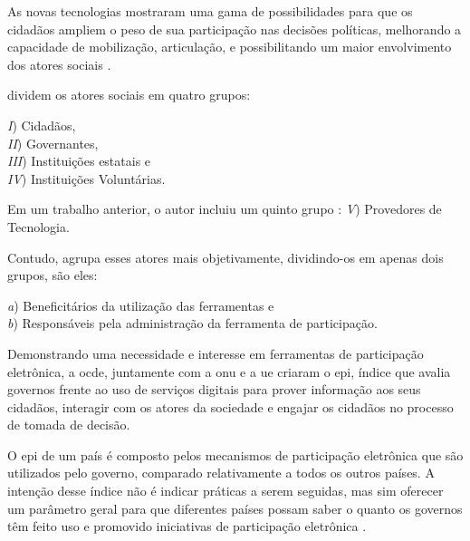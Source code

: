As novas tecnologias mostraram uma gama de possibilidades para que os cidadãos ampliem o peso de sua participação nas decisões políticas,
melhorando a capacidade de mobilização, articulação, e possibilitando um maior envolvimento dos atores sociais \cite{araujo2015democracia}.\\

\par
{} dividem os atores sociais em quatro grupos: 

\begin{minipage}{.66\textwidth}	
   \textit{I}) Cidadãos, \\
   \textit{II}) Governantes, \\
   \textit{III}) Instituições estatais e \\
   \textit{IV}) Instituições Voluntárias. \\
\end{minipage}

\par
Em um trabalho anterior, o autor incluiu um quinto grupo \cite{macintosh2006evaluating}:
\textit{V}) Provedores de Tecnologia.
\par
Contudo,  agrupa esses atores mais objetivamente, dividindo-os em apenas dois grupos, são eles:\\
\begin{minipage}{.75\textwidth}	
   \textit{a}) Beneficitários da utilização das ferramentas e \\
   \textit{b}) Responsáveis pela administração da ferramenta de participação.  \\
\end{minipage}

\par
Demonstrando uma necessidade e interesse em ferramentas de participação eletrônica, a \acrfull{ocde}, juntamente com a \acrshort{onu} e a \acrfull{ue} criaram o \acrfull{epi}, 
índice que avalia governos frente ao uso de serviços digitais para prover informação aos seus cidadãos, interagir com os atores da sociedade e engajar os cidadãos no processo de tomada de decisão. 

\par 
O \acrshort{epi} de um país é composto pelos mecanismos de participação eletrônica que são utilizados pelo governo, comparado relativamente a todos os outros países.
A intenção desse índice não é indicar práticas a serem seguidas, mas sim oferecer um parâmetro geral para que diferentes países possam saber o quanto os governos têm 
feito uso e promovido iniciativas de participação eletrônica \cite{onu2018} .

